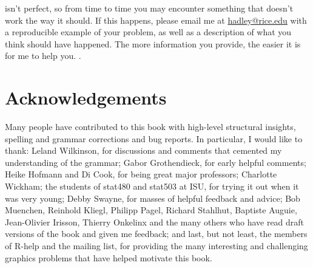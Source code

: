 \ggplot isn't perfect, so from time to time you may encounter something that doesn't work the way it should.  If this happens, please email me at \href{mailto:hadley@rice.edu}{hadley@rice.edu} with a reproducible example of your problem, as well as a description of what you think should have happened.  The more information you provide, the easier it is for me to help you. .

\section{Acknowledgements}\label{sec:acknolwedgements}

Many people have contributed to this book with high-level structural insights, spelling and grammar corrections and bug reports.  In particular, I would like to thank: Leland Wilkinson, for discussions and comments that cemented my understanding of the grammar; Gabor Grothendieck, for early helpful comments; Heike Hofmann and Di Cook, for being great major professors; Charlotte Wickham; the students of stat480 and stat503 at ISU, for trying it out when it was very young; Debby Swayne, for masses of helpful feedback and advice; Bob Muenchen, Reinhold Kliegl, Philipp Pagel, Richard Stahlhut, Baptiste Auguie, Jean-Olivier Irisson, Thierry Onkelinx and the many others who have read draft versions of the book and given me feedback; and last, but not least, the members of R-help and the \ggplot mailing list, for providing the many interesting and challenging graphics problems that have helped motivate this book.


